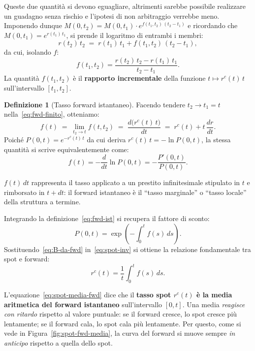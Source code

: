 \documentclass[11pt,a4paper]{article}
\theoremstyle{plain}
\theoremstyle{definition}
\newtheorem{definizione}[teorema]{Definizione}
\theoremstyle{remark}
\begin{document}
Queste due quantit\`a si devono eguagliare, altrimenti sarebbe possibile realizzare un guadagno
senza rischio e l'ipotesi di non arbitraggio verrebbe meno. Imponendo dunque
$M(0,t_2) = M(0,t_1)\cdot e^{f(t_1,t_2)\,(t_2-t_1)}$ e ricordando che $M(0,t_1)=e^{r(t_1)\,t_1}$, si prende il logaritmo di entrambi i membri:
\[
  r(t_2)\,t_2 \;=\; r(t_1)\,t_1 + f(t_1,t_2)\,(t_2-t_1),
\]
da cui, isolando $f$:
\begin{equation}
  f(t_1, t_2) = \frac{r(t_2)\,t_2 - r(t_1)\,t_1}{t_2 - t_1}.
  \label{eq:fwd-finito}
\end{equation}
La quantità $f(t_1,t_2)$ \`e il \textbf{rapporto incrementale} della funzione
$t\mapsto r^c(t)\,t$ sull'intervallo $[t_1,t_2]$.

\begin{definizione}[Tasso forward istantaneo]
\label{def:forward}
Facendo tendere $t_2 \to t_1 = t$ nella~\eqref{eq:fwd-finito}, otteniamo:
\begin{equation}
  f(t) \;=\; \lim_{t_2 \to t} f(t, t_2)
       \;=\; \frac{d\bigl(r^c(t)\,t\bigr)}{dt}
       \;=\; r^c(t) + t\,\frac{dr}{dt}.
  \label{eq:fwd-ist}
\end{equation}
Poich\'e $P(0,t)=e^{-r^c(t)\,t}$ da cui deriva $r^c(t)\,t=-\ln P(0,t)$, la stessa quantit\`a si
scrive equivalentemente come:
\[
  f(t) = -\frac{d}{dt}\ln P(0,t) = -\frac{P'(0,t)}{P(0,t)}.
\]
\end{definizione}

$f(t)\,dt$ rappresenta il tasso applicato a un prestito infinitesimale stipulato in $t$
e rimborsato in $t+dt$: il forward istantaneo \`e il ``tasso marginale'' o ``tasso locale''
della struttura a termine.


Integrando la definizione~\eqref{eq:fwd-ist} si recupera il fattore di sconto:
\begin{equation}
  P(0,t) = \exp\!\left(-\int_0^t f(s)\,ds\right).
  \label{eq:B-da-fwd}
\end{equation}
Sostituendo~\eqref{eq:B-da-fwd} in~\eqref{eq:spot-inv} si ottiene la relazione
fondamentale tra spot e forward:
\begin{equation}
  r^c(t) = \frac{1}{t}\int_0^t f(s)\,ds.
  \label{eq:spot-media-fwd}
\end{equation}

L'equazione~\eqref{eq:spot-media-fwd} dice che il \textbf{tasso spot $r^c(t)$ \`e la media
aritmetica del forward istantaneo} sull'intervallo $[0,t]$. Una media \emph{reagisce con
ritardo} rispetto al valore puntuale: se il forward cresce, lo spot cresce pi\`u lentamente;
se il forward cala, lo spot cala pi\`u lentamente. Per questo, come si vede in
Figura~\ref{fig:spot-fwd-media}, la curva del forward si muove sempre \emph{in anticipo}
rispetto a quella dello spot.
\end{document}
